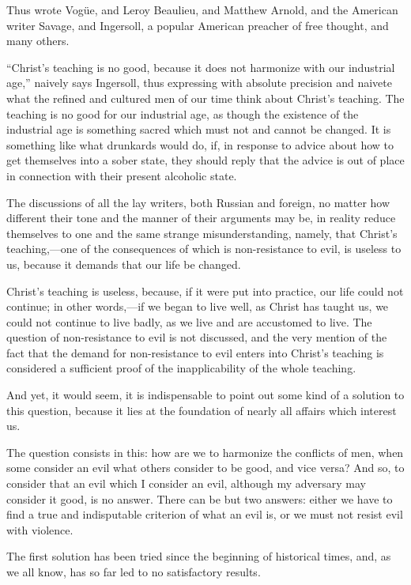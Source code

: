 \documentclass{book}
\begin{document}
Thus wrote Vogüe, and Leroy Beaulieu, and Matthew Arnold, and the American writer Savage, and Ingersoll, a popular American preacher of free thought, and many others.

“Christ’s teaching is no good, because it does not harmonize with our industrial age,” naively says Ingersoll, thus expressing with absolute precision and naivete what the refined and cultured men of our time think about Christ’s teaching. The teaching is no good for our industrial age, as though the existence of the industrial age is something sacred which must not and cannot be changed. It is something like what drunkards would do, if, in response to advice about how to get themselves into a sober state, they should reply that the advice is out of place in connection with their present alcoholic state.

The discussions of all the lay writers, both Russian and foreign, no matter how different their tone and the manner of their arguments may be, in reality reduce themselves to one and the same strange misunderstanding, namely, that Christ’s teaching,—one of the consequences of which is non-resistance to evil, is useless to us, because it demands that our life be changed.

Christ’s teaching is useless, because, if it were put into practice, our life could not continue; in other words,—if we began to live well, as Christ has taught us, we could not continue to live badly, as we live and are accustomed to live. The question of non-resistance to evil is not discussed, and the very mention of the fact that the demand for non-resistance to evil enters into Christ’s teaching is considered a sufficient proof of the inapplicability of the whole teaching.

And yet, it would seem, it is indispensable to point out some kind of a solution to this question, because it lies at the foundation of nearly all affairs which interest us.

The question consists in this: how are we to harmonize the conflicts of men, when some consider an evil what others consider to be good, and vice versa? And so, to consider that an evil which I consider an evil, although my adversary may consider it good, is no answer. There can be but two answers: either we have to find a true and indisputable criterion of what an evil is, or we must not resist evil with violence.

The first solution has been tried since the beginning of historical times, and, as we all know, has so far led to no satisfactory results.
\end{document}
